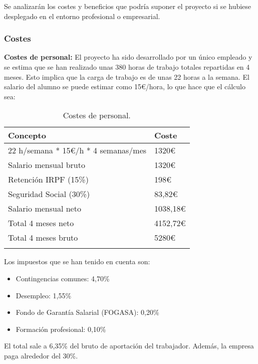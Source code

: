 Se analizarán los costes y beneficios que podría suponer el proyecto si se hubiese desplegado en el entorno profesional o empresarial.

\subsubsection{Costes}


\textbf{Costes de personal:}
El proyecto ha sido desarrollado por un único empleado y se estima que se han realizado unas 380 horas de trabajo totales repartidas en 4 meses. Esto implica que la carga de trabajo es de unas 22 horas a la semana. El salario del alumno se puede estimar como 15€/hora, lo que hace que el cálculo sea:

\begin{longtable}{@{} p{8cm} p{3cm} @{}}
  \toprule
  \rowcolor{gray!20}
  Concepto & Coste \\ 
  \midrule
  
  22 h/semana * 15€/h * 4 semanas/mes  & 1320€ \\ 
  \midrule
  
  \endhead
  Salario mensual bruto  & 1320€ \\ 
  \midrule

  Retención IRPF (15\%) & 198€ \\ 
  \midrule

  Seguridad Social (30\%) & 83,82€ \\ 
  \midrule

  Salario mensual neto & 1038,18€ \\ 
  \midrule
  \midrule

  Total 4 meses neto & 4152,72€ \\ 
  \midrule

  Total 4 meses bruto & 5280€ \\ 
  
  \bottomrule
  \caption{Costes de personal.}
\end{longtable}

Los impuestos que se han tenido en cuenta son:
\begin{itemize}
\item Contingencias comunes: 4,70\%
\item Desempleo: 1,55\%
\item Fondo de Garantía Salarial (FOGASA): 0,20\%
\item Formación profesional: 0,10\%
\end{itemize}

El total sale a 6,35\% del bruto de aportación del trabajador. Además, la empresa paga alrededor del 30\%.

